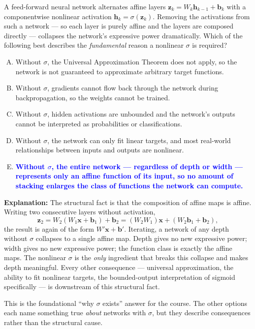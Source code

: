 \documentclass[12pt]{amsart}
\begin{document}
A feed-forward neural network alternates affine layers
$\mathbf{z}_k = W_k \mathbf{h}_{k-1} + \mathbf{b}_k$ with a componentwise
nonlinear activation $\mathbf{h}_k = \sigma(\mathbf{z}_k)$. Removing the
activations from such a network --- so each layer is purely affine and
the layers are composed directly --- collapses the network's expressive
power dramatically. Which of the following best describes the
\emph{fundamental} reason a nonlinear $\sigma$ is required?

\begin{enumerate}[(A)]
\item Without $\sigma$, the Universal Approximation Theorem does not apply, so the network is not guaranteed to approximate arbitrary target functions.
\item Without $\sigma$, gradients cannot flow back through the network during backpropagation, so the weights cannot be trained.
\item Without $\sigma$, hidden activations are unbounded and the network's outputs cannot be interpreted as probabilities or classifications.
\item Without $\sigma$, the network can only fit linear targets, and most real-world relationships between inputs and outputs are nonlinear.
\item \textcolor{blue}{\textbf{Without $\sigma$, the entire network --- regardless of depth or width --- represents only an affine function of its input, so no amount of stacking enlarges the class of functions the network can compute.}}
\end{enumerate}

\textbf{Explanation:}
The structural fact is that the composition of affine maps is affine.
Writing two consecutive layers without activation,
$$\mathbf{z}_2 = W_2(W_1 \mathbf{x} + \mathbf{b}_1) + \mathbf{b}_2 = (W_2 W_1) \mathbf{x} + (W_2 \mathbf{b}_1 + \mathbf{b}_2),$$
the result is again of the form $W' \mathbf{x} + \mathbf{b}'$. Iterating,
a network of any depth without $\sigma$ collapses to a single affine map.
Depth gives no new expressive power; width gives no new expressive power;
the function class is exactly the affine maps. The nonlinear $\sigma$ is
the \emph{only} ingredient that breaks this collapse and makes depth
meaningful. Every other consequence --- universal approximation, the
ability to fit nonlinear targets, the bounded-output interpretation of
sigmoid specifically --- is downstream of this structural fact.

This is the foundational ``why $\sigma$ exists'' answer for the course.
The other options each name something true \emph{about} networks with
$\sigma$, but they describe consequences rather than the structural cause.
\end{document}
